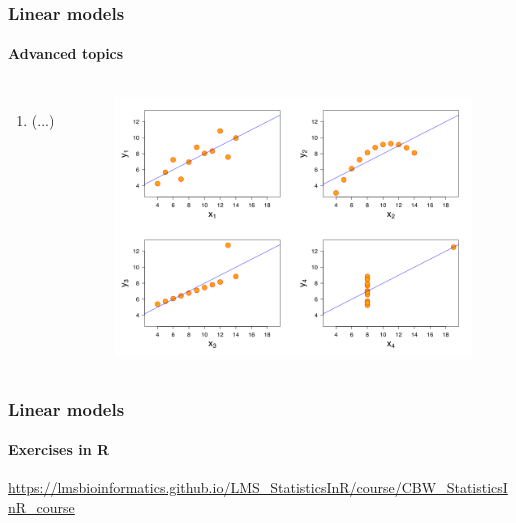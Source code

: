 \documentclass[aspectratio=43]{beamer}
\begin{document}
\begin{frame}
	
	\frametitle{Linear models}
	\framesubtitle{Advanced topics}
	
	\footnotesize
	
	\begin{columns}
		
		
		\begin{enumerate}
			\item (...)
		\end{enumerate}
		
		
		\begin{figure}[!htb]
			\includegraphics[width = \linewidth]{plots/part2/linear_model.png}
		\end{figure}
		
	\end{columns}

\end{frame}

\begin{frame}
	
	\frametitle{Linear models}
	\framesubtitle{Exercises in R}
	
	\footnotesize

	\href{https://lmsbioinformatics.github.io/LMS_StatisticsInR/course/CBW_StatisticsInR_course.html}{https://lmsbioinformatics.github.io/LMS\_StatisticsInR/course/CBW\_StatisticsInR\_course}


\end{frame}
\end{document}
